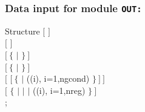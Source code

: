 \vskip 0.2cm

\subsubsection{Data input for module {\tt OUT:}}\label{sect:out_data}

\begin{DataStructure}{Structure }
$[$   $]$ \\
$[$   $]$ \\
$[~\{$  $|$  $\}~]$ \\
$[~\{$   $|$   $\}~]$ \\
$[$  $[~\{$  $|$ ((i), i=1,ngcond) $\}~]~]$ \\
$[$  $\{$  $|$  $|$  $|$ ((i), i=1,nreg) $\}~]$ \\
;
\end{DataStructure}


